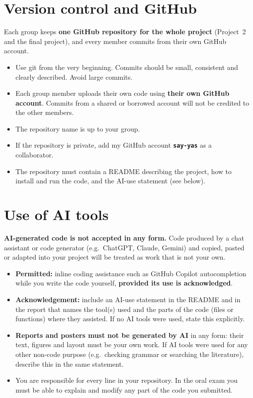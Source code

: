\documentclass[11pt,a4paper]{article}
\begin{document}
\section*{Version control and GitHub}
Each group keeps \textbf{one GitHub repository for the whole project}
(Project~2 and the final project), and every member commits from their own
GitHub account.
\begin{itemize}
  \item Use git from the very beginning. Commits should be small, consistent
        and clearly described. Avoid large commits.
  \item Each group member uploads their own code using \textbf{their own
        GitHub account}. Commits from a shared or borrowed account will not
        be credited to the other members.
  \item The repository name is up to your group.
  \item If the repository is private, add my GitHub account
        \textbf{\texttt{say-yas}} as a collaborator.
  \item The repository must contain a README describing the project, how to
        install and run the code, and the AI-use statement (see below).
\end{itemize}

\section*{Use of AI tools}
\textbf{AI-generated code is not accepted in any form.} Code produced by a
chat assistant or code generator (e.g.\ ChatGPT, Claude, Gemini) and copied,
pasted or adapted into your project will be treated as work that is not your
own.
\begin{itemize}
  \item \textbf{Permitted:} inline coding assistance such as GitHub Copilot
        autocompletion while you write the code yourself, \textbf{provided its
        use is acknowledged}.
  \item \textbf{Acknowledgement:} include an AI-use statement in the README
        and in the report that names the tool(s) used and the parts of the
        code (files or functions) where they assisted. If no AI tools were
        used, state this explicitly.
  \item \textbf{Reports and posters must not be generated by AI} in any
        form: their text, figures and layout must be your own work. If AI
        tools were used for any other non-code purpose (e.g.\ checking
        grammar or searching the literature), describe this in the same
        statement.
  \item You are responsible for every line in your repository. In the oral
        exam you must be able to explain and modify any part of the code you
        submitted.
\end{itemize}
\end{document}
